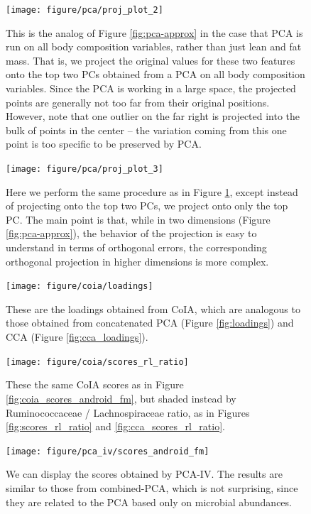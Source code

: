 \documentclass{article}
\begin{document}
\begin{figure}
  \texttt{[image: figure/pca/proj\_plot\_2]}
  \caption{This is the analog of Figure \ref{fig:pca-approx} in the case that
    PCA is run on all body composition variables, rather than just lean and
    fat mass. That is, we project the original values for these two features
    onto the top two PCs obtained from a PCA on all body composition variables.
    Since the PCA is working in a large space, the projected points are
    generally not too far from their original positions. However, note that one
    outlier on the far right is projected into the bulk of points in the center
    -- the variation coming from this one point is too specific to be preserved
    by PCA.
  \label{fig:pca-approx-2}}
\end{figure}

\begin{figure}
  \texttt{[image: figure/pca/proj\_plot\_3]}
  \caption{Here we perform the same procedure as in Figure
    \ref{fig:pca-approx-2}, except instead of projecting onto the top two PCs,
    we project onto only the top PC. The main point is that, while in two
    dimensions (Figure \ref{fig:pca-approx}), the behavior of the projection is
    easy to understand in terms of orthogonal errors, the corresponding
    orthogonal projection in higher dimensions is more complex.
  \label{fig:pca-approx-3}}
\end{figure}

\begin{figure}
  \centering \texttt{[image: figure/coia/loadings]}
  \caption{These are the loadings obtained from CoIA, which are analogous to
    those obtained from concatenated PCA (Figure \ref{fig:loadings}) and CCA
    (Figure \ref{fig:cca_loadings}). \label{fig:coia_loadings} }
\end{figure}

\begin{figure}
  \centering
  \texttt{[image: figure/coia/scores\_rl\_ratio]}
  \caption{These the same CoIA scores as in Figure \ref{fig:coia_scores_android_fm},
    but shaded instead by Ruminococcaceae / Lachnospiraceae ratio, as in Figures
    \ref{fig:scores_rl_ratio} and
    \ref{fig:cca_scores_rl_ratio}. \label{fig:coia_scores_rl_ratio} }
\end{figure}

\begin{figure}
  \centering
  \texttt{[image: figure/pca\_iv/scores\_android\_fm]}
  \caption{We can display the scores obtained by PCA-IV. The results are similar
    to those from combined-PCA, which is not surprising, since they are related
    to the PCA based only on microbial
    abundances. \label{fig:pca_iv_scores_android_fm} }
\end{figure}
\end{document}
